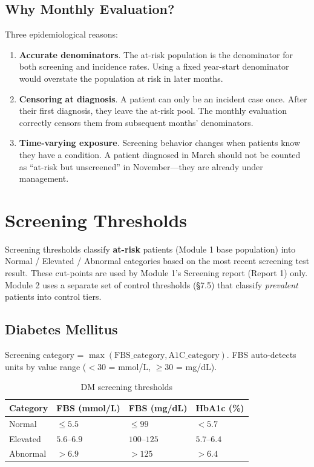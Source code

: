\documentclass[11pt,a4paper]{article}
\begin{document}
\subsection{Why Monthly Evaluation?}

Three epidemiological reasons:

\begin{enumerate}[leftmargin=*]
    \item \textbf{Accurate denominators}. The at-risk population is the denominator for both screening and incidence rates. Using a fixed year-start denominator would overstate the population at risk in later months.
    \item \textbf{Censoring at diagnosis}. A patient can only be an incident case once. After their first diagnosis, they leave the at-risk pool. The monthly evaluation correctly censors them from subsequent months' denominators.
    \item \textbf{Time-varying exposure}. Screening behavior changes when patients know they have a condition. A patient diagnosed in March should not be counted as ``at-risk but unscreened'' in November---they are already under management.
\end{enumerate}

\section{Screening Thresholds}

Screening thresholds classify \textbf{at-risk} patients (Module 1 base population) into Normal / Elevated / Abnormal categories based on the most recent screening test result. These cut-points are used by Module 1's Screening report (Report 1) only. Module 2 uses a separate set of control thresholds (§7.5) that classify \textit{prevalent} patients into control tiers.

\subsection{Diabetes Mellitus}

Screening category = $\max(\text{FBS\_category}, \text{A1C\_category})$. FBS auto-detects units by value range ($< 30$ = mmol/L, $\geq 30$ = mg/dL).

\begin{table}[ht]
\centering
\caption{DM screening thresholds}
\begin{tabular}{@{}llll@{}}
\toprule
\textbf{Category} & \textbf{FBS (mmol/L)} & \textbf{FBS (mg/dL)} & \textbf{HbA1c (\%)} \\
\midrule
Normal   & $\leq 5.5$    & $\leq 99$    & $< 5.7$ \\
Elevated & $5.6$--$6.9$  & $100$--$125$ & $5.7$--$6.4$ \\
Abnormal & $> 6.9$       & $> 125$      & $> 6.4$ \\
\bottomrule
\end{tabular}
\end{table}
\end{document}
